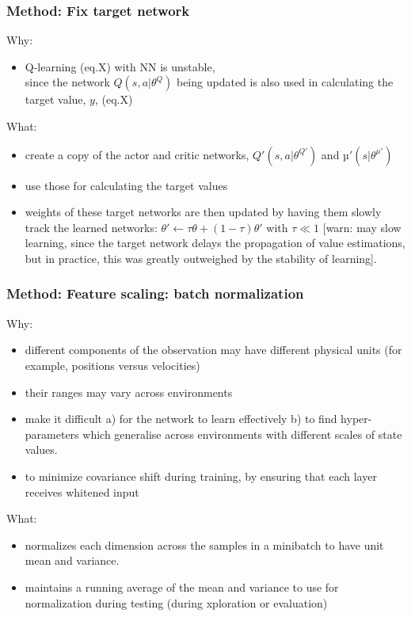 \begin{frame}
\frametitle{Method: Fix target network}
Why:
\begin{itemize}
\item Q-learning (eq.X) with NN is unstable, \\
since the network $Q(s, a|\theta^Q)$ being updated is also used in
calculating the target value, $y$, (eq.X)
\end{itemize}

What:
\begin{itemize}
\item create a copy of the actor and critic networks, $Q'(s, a|\theta^{Q'})$ and $µ'(s|\theta^{\mu'})$
\item use those for calculating the target values
\item weights of these target networks are then updated by having them slowly track the learned networks:
    $θ' \leftarrow \tau \theta + (1 - \tau) \theta'$ with $\tau \ll 1$
    [warn: may slow learning, since the target network delays the propagation of value estimations, but
    in practice, this was greatly outweighed by the stability of learning].
\end{itemize}

\end{frame}


\begin{frame}
\frametitle{Method: Feature scaling: batch normalization}
Why:
\begin{itemize}
\item different components of the observation may have different physical units (for example, positions versus velocities)
\item their ranges may vary across environments
\item make it difficult
  a) for the network to learn effectively
  b) to find hyper-parameters which generalise across environments with different scales of state values.
\item to minimize covariance shift during training, by ensuring that each layer receives whitened input
\end{itemize}

What:
\begin{itemize}
\item normalizes each dimension across the samples in a minibatch to have unit mean and variance.
\item maintains a running average of the mean and variance to use for normalization during testing
(during xploration or evaluation)
\end{itemize}

\end{frame}

